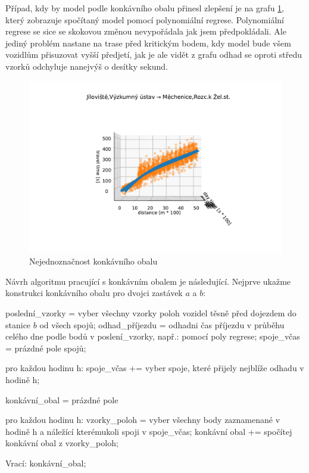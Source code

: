 \bigbreak

Případ, kdy by model podle konkávního obalu přinesl zlepšení je na grafu \ref{fig:good_to_concave_hull}, který zobrazuje spočítaný model pomocí polynomiální regrese. Polynomiální regrese se sice se skokovou změnou nevypořádala jak jsem předpokládali. Ale jediný problém nastane na trase před kritickým bodem, kdy model bude všem vozidlům přisuzovat vyšší předjetí, jak je ale vidět z grafu odhad se oproti středu vzorků odchyluje nanejvýš o desítky sekund.

\begin{figure}
	\centering
  \includegraphics[width=1\linewidth]{../img/good_to_concave_hull}
  \caption{Nejednoznačnost konkávního obalu}
  \label{fig:good_to_concave_hull}
\end{figure}

\bigbreak

Návrh algoritmu pracující s konkávním obalem je následující. Nejprve ukažme konstrukci konkávního obalu pro dvojci zastávek $a$ a $b$:

\begin{code}[frame=none]
poslední_vzorky = vyber všechny vzorky poloh vozidel
  těsně před dojezdem do stanice $b$ od všech spojů;
odhad_příjezdu = odhadni čas příjezdu v průběhu celého
  dne podle bodů v poslení_vzorky, např.: pomocí poly regrese;
spoje_včas = prázdné pole spojů;

pro každou hodinu h:
  spoje_včas += vyber spoje, které přijely nejblíže
    odhadu v hodině h;

konkávní_obal = prázdné pole

pro každou hodinu h:
  vzorky_poloh = vyber všechny body zaznamenané
    v hodině h a náležící kterémukoli spoji v spoje_včas;
  konkávní obal += spočítej konkávní obal z vzorky_poloh;

Vrací: konkávní_obal;
\end{code}


